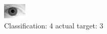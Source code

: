 \begin{figure}[h!]
\begin{center}
\includegraphics[width=0.60\columnwidth]{figures/ID2177_class_4_target_3.png}
\end{center}
\caption{ Classification: 4 actual target: 3}
\label{fig:ID2177_class_4_target_3}
\end{figure}
